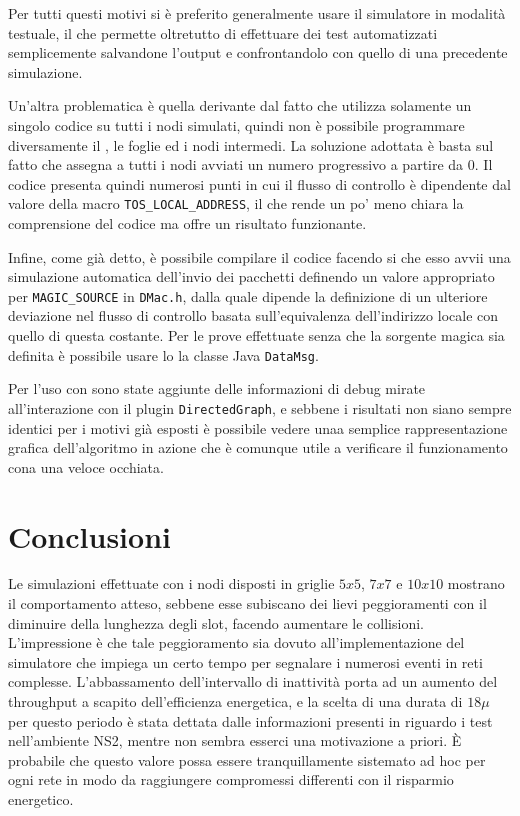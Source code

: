 \documentclass[twoside,11pt,a4paper,italian,openany]{book}
\begin{document}
Per tutti questi motivi si è preferito generalmente usare il simulatore in modalità testuale, 
il che permette oltretutto di effettuare dei test automatizzati semplicemente salvandone
 l'output e confrontandolo con quello di una precedente simulazione. 

Un'altra problematica è quella derivante dal fatto che \tos utilizza solamente un singolo 
codice su tutti i nodi simulati, quindi non è possibile programmare diversamente il \sink, 
le foglie ed i nodi intermedi. 
La soluzione adottata è basta sul fatto che \tos assegna a tutti i nodi avviati un numero 
progressivo a partire da $0$. 
Il codice presenta quindi numerosi punti in cui il flusso di controllo 
è dipendente dal valore della macro \texttt{TOS\_LOCAL\_ADDRESS}, il che rende un po' meno 
chiara la comprensione del codice ma offre un risultato funzionante. 

Infine, come già detto, è possibile compilare il codice facendo si che esso avvii una 
simulazione automatica dell'invio dei pacchetti definendo un valore appropriato per 
\texttt{MAGIC\_SOURCE} in \texttt{DMac.h}, dalla quale dipende la definizione di un ulteriore 
deviazione nel flusso di controllo basata sull'equivalenza dell'indirizzo locale con quello di 
questa costante. 
Per le prove effettuate senza che la sorgente magica sia definita è possibile usare lo 
la classe Java \texttt{DataMsg}.

Per l'uso con \tv sono state aggiunte delle informazioni di debug mirate all'interazione con 
il plugin  \texttt{DirectedGraph}, e sebbene i risultati non siano sempre identici per i 
motivi già esposti è possibile vedere unaa semplice rappresentazione grafica dell'algoritmo 
in azione che è comunque utile a verificare il funzionamento cona una veloce occhiata. 

\chapter{Conclusioni}
Le simulazioni effettuate con i nodi disposti in griglie $5x5$, $7x7$ e $10x10$ mostrano il
comportamento atteso, sebbene esse subiscano dei lievi peggioramenti con il diminuire della 
lunghezza degli slot, facendo aumentare le collisioni.
L'impressione è che tale peggioramento sia dovuto all'implementazione del simulatore 
che impiega un certo tempo per segnalare i numerosi eventi in reti complesse. 
L'abbassamento dell'intervallo di inattività porta ad un aumento del throughput 
a scapito dell'efficienza energetica, e la scelta di una durata di $18\mu$ per questo periodo 
è stata dettata dalle informazioni presenti in \cite{DMAC} riguardo i test nell'ambiente 
NS2, mentre non sembra esserci una motivazione a priori. \`E probabile che questo valore 
possa essere tranquillamente sistemato ad hoc per ogni rete in modo da raggiungere compromessi 
differenti con il risparmio energetico. 
\end{document}
